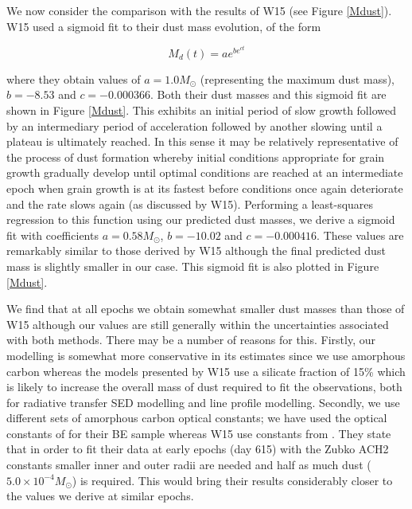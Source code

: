 \documentclass[useAMS,usenatbib,usegraphicx]{mnras}
\begin{document}
We now consider the comparison with the results of W15 (see Figure \ref{Mdust}).  W15 used a sigmoid 
fit to their dust mass evolution, of the form

\begin{equation}
M_d(t)=ae^{be^{ct}}
\end{equation}
 
where they obtain values of $a=1.0M_{\odot}$ (representing the maximum 
dust mass), $b=-8.53$ and $c=-0.000366$.  Both their dust masses and this 
sigmoid fit are shown in Figure \ref{Mdust}.  This exhibits an initial 
period of slow growth followed by an intermediary period of acceleration 
followed by another slowing until a plateau is ultimately reached.  In 
this sense it may be relatively representative of the process of dust 
formation whereby initial conditions appropriate for grain growth 
gradually develop until optimal conditions are reached at an intermediate 
epoch when grain growth is at its fastest before conditions once again 
deteriorate and the rate slows again (as discussed by W15).  Performing a 
least-squares regression to this function using our predicted dust masses, 
we derive a sigmoid fit with coefficients $a=0.58M_{\odot}$, $b=-10.02$ 
and $c=-0.000416$.  These values are remarkably similar to those derived 
by W15 although the final predicted dust mass is slightly smaller in our 
case.  This sigmoid fit is also plotted in Figure \ref{Mdust}.

We find that at all epochs we obtain somewhat smaller dust masses than those of W15 although our values are still generally within the uncertainties associated with both methods.  There may be a number of  reasons for 
this.  Firstly, our modelling is somewhat more conservative in its 
estimates since we use amorphous carbon whereas the 
models presented by W15 use a silicate fraction of 15\% which is likely to 
increase the overall mass of dust required to fit the  
observations, both for radiative transfer SED modelling and 
line profile modelling.  Secondly, we use different sets of amorphous carbon optical 
constants; we have used the optical constants of \cite{Zubko1996} 
for their BE sample whereas W15 use constants from 
\cite{Hanner1988}.  They state that in order to 
fit their data at early epochs (day 615) with the Zubko ACH2 constants 
smaller inner and outer radii are needed and half as much dust ($5.0 
\times 10^{-4}M_{\odot}$) is required.  This would bring their results considerably closer to the 
values we derive at similar epochs.
\end{document}
